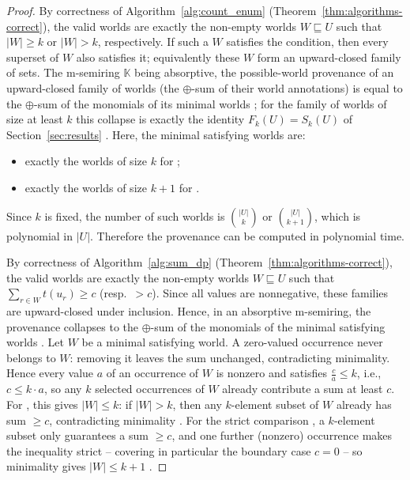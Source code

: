 \begin{proof}
By correctness of Algorithm~\ref{alg:count_enum}
(Theorem~\ref{thm:algorithms-correct}), the valid worlds are exactly the non-empty worlds
$W\sqsubseteq U$ such that $|W|\ge k\text{ or }|W|>k$, respectively.
  If such a $W$ satisfies the condition, then every superset of $W$ also satisfies it; equivalently these $W$ form an upward-closed family of sets. The m-semiring $\mathbb K$ being absorptive, the possible-world provenance of an upward-closed family of worlds (the $\oplus$-sum of their world annotations) is equal to the $\oplus$-sum of the monomials of its minimal worlds ; for the family of worlds of size at least $k$ this collapse is exactly the identity $F_k(U)=S_k(U)$ of Section~\ref{sec:results} . Here, the minimal satisfying worlds are:
\begin{itemize}
\item exactly the worlds of size $k$ for ;
\item exactly the worlds of size $k+1$ for .
\end{itemize}
Since $k$ is fixed, the number of such worlds is $\binom{|U|}{k}\text{ or }\binom{|U|}{k+1}$,
which is polynomial in $|U|$. Therefore the provenance can be computed in polynomial time.

By correctness of Algorithm~\ref{alg:sum_dp}
(Theorem~\ref{thm:algorithms-correct}), the valid worlds are exactly the non-empty worlds
$W\sqsubseteq U$ such that $\sum_{r\in W} t(u_r)\ge c$ (resp.\ $>c$).
Since all values are nonnegative, these families are upward-closed under inclusion. Hence, in an absorptive m-semiring, the provenance collapses to the $\oplus$-sum of the monomials of the minimal satisfying worlds
 .
Let $W$ be a minimal satisfying world. A zero-valued occurrence never belongs to $W$: removing it leaves the sum unchanged, contradicting minimality. Hence every value $a$ of an occurrence of $W$ is nonzero and satisfies $\frac ca\le k$, i.e., $c\le k\cdot a$, so any $k$ selected occurrences of $W$ already contribute a sum at least $c$. For , this gives $|W|\le k$: if $|W|>k$, then any $k$-element subset of $W$ already has sum $\ge c$, contradicting minimality . For the strict comparison , a $k$-element subset only guarantees a sum $\ge c$, and one further (nonzero) occurrence makes the inequality strict -- covering in particular the boundary case $c=0$ -- so minimality gives $|W|\le k+1$ .


\end{proof}

